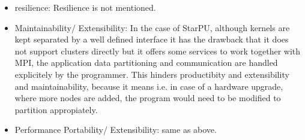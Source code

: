 \begin{itemize}
\item resilience: Resilience is not mentioned. 
\item Maintainability/ Extensibility: In the case of StarPU, although kernels are kept separated by a well defined interface it has the drawback that it does not support clusters directly but it offers some services to work together with MPI, the application data partitioning and communication are handled explicitely by the programmer. This hinders productibity and extensibility and maintainability, because it means i.e. in case of a hardware upgrade, where more nodes are added, the program would need to be modified to partition appropiately.
\item Performance Portability/ Extensibility: same as above.
\end{itemize}
